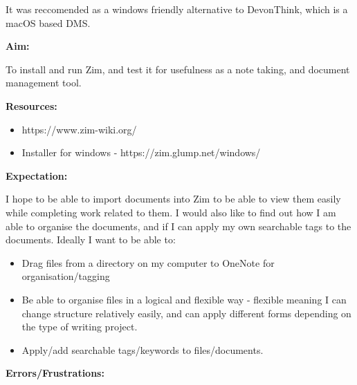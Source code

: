 \documentclass{article}
\begin{document}
It was reccomended as a windows friendly alternative to DevonThink, which is a macOS based DMS. 

\textbf{Aim:}

To install and run Zim, and test it for usefulness as a note taking, and document management tool.

\textbf{Resources:}
\begin{itemize}
    \item https://www.zim-wiki.org/
    \item Installer for windows - https://zim.glump.net/windows/
\end{itemize}

\textbf{Expectation:}

I hope to be able to import documents into Zim to be able to view them easily while completing work related to them. I would also like to find out how I am able to organise the documents, and if I can apply my own searchable tags to the documents.
Ideally I want to be able to:
\begin{itemize}
    \item Drag files from a directory on my computer to OneNote for organisation/tagging
    \item Be able to organise files in a logical and flexible way - flexible meaning I can change structure relatively easily, and can apply different forms depending on the type of writing project.
    \item Apply/add searchable tags/keywords to files/documents.
\end{itemize}

\label{Error: Zim Errors/Frustrations}
\textbf{Errors/Frustrations:}
\end{document}
